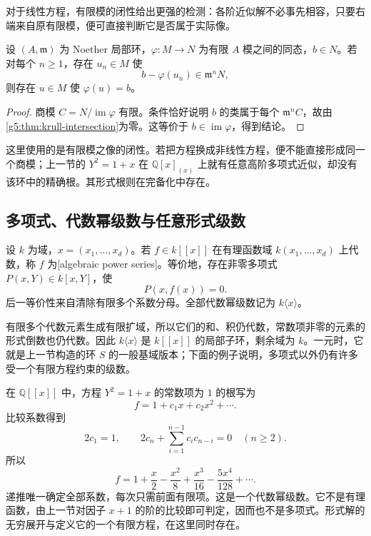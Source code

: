 \ProseParagraphBreak

对于线性方程，有限模的闭性给出更强的检测：各阶近似解不必事先相容，只要右端来自原有限模，便可直接判断它是否属于实际像。

\begin{proposition}\label{g5:prop:linear-approximation-closed-image}
	设 \((A,\mathfrak m)\) 为 Noether 局部环，\(\varphi:M\to N\) 为有限 \(A\) 模之间的同态，\(b\in N\)。若对每个 \(n\geq1\)，存在 \(u_n\in M\) 使
	\[
		b-\varphi(u_n)\in\mathfrak m^nN,
	\]
	则存在 \(u\in M\) 使 \(\varphi(u)=b\)。
\end{proposition}
\begin{proof}
	商模 \(C=N/\operatorname{im}\varphi\) 有限。条件恰好说明 \(b\) 的类属于每个 \(\mathfrak m^nC\)，故由\cref{g5:thm:krull-intersection}为零。这等价于 \(b\in\operatorname{im}\varphi\)，得到结论。
\end{proof}

这里使用的是有限模之像的闭性。若把方程换成非线性方程，便不能直接形成同一个商模；上一节的 \(Y^2=1+x\) 在 \(\mathbb Q[x]_{(x)}\) 上就有任意高阶多项式近似，却没有该环中的精确根。其形式根则在完备化中存在。

\subsection{多项式、代数幂级数与任意形式级数}
\label{g5:subsec:0705:02}

\begin{definition}\label{g5:def:algebraic-power-series}
	设 \(k\) 为域，\(x=(x_1,\ldots,x_d)\)。若 \(f\in k[[x]]\) 在有理函数域 \(k(x_1,\ldots,x_d)\) 上代数，称 \(f\) 为[algebraic power series]。等价地，存在非零多项式 \(P(x,Y)\in k[x,Y]\)，使
	\[
		P(x,f(x))=0.
	\]
	后一等价性来自清除有限多个系数分母。全部代数幂级数记为 \(k\langle x\rangle\)。
\end{definition}

有限多个代数元素生成有限扩域，所以它们的和、积仍代数，常数项非零的元素的形式倒数也仍代数。因此 \(k\langle x\rangle\) 是 \(k[[x]]\) 的局部子环，剩余域为 \(k\)。一元时，它就是上一节构造的环 \(S\) 的一般基域版本；下面的例子说明，多项式以外仍有许多受一个有限方程约束的级数。

\begin{example}\label{g5:exm:algebraic-square-root}
	在 \(\mathbb Q[[x]]\) 中，方程 \(Y^2=1+x\) 的常数项为 \(1\) 的根写为
	\[
		f=1+c_1x+c_2x^2+\cdots.
	\]
	比较系数得到
	\[
		2c_1=1,\qquad
		2c_n+\sum_{i=1}^{n-1}c_ic_{n-i}=0\quad(n\geq2).
	\]
	所以
	\[
		f=1+\frac{x}{2}-\frac{x^2}{8}+\frac{x^3}{16}
		-\frac{5x^4}{128}+\cdots.
	\]
	递推唯一确定全部系数，每次只需前面有限项。这是一个代数幂级数。它不是有理函数，由上一节对因子 \(x+1\) 的阶的比较即可判定，因而也不是多项式。形式解的无穷展开与定义它的一个有限方程，在这里同时存在。
\end{example}

